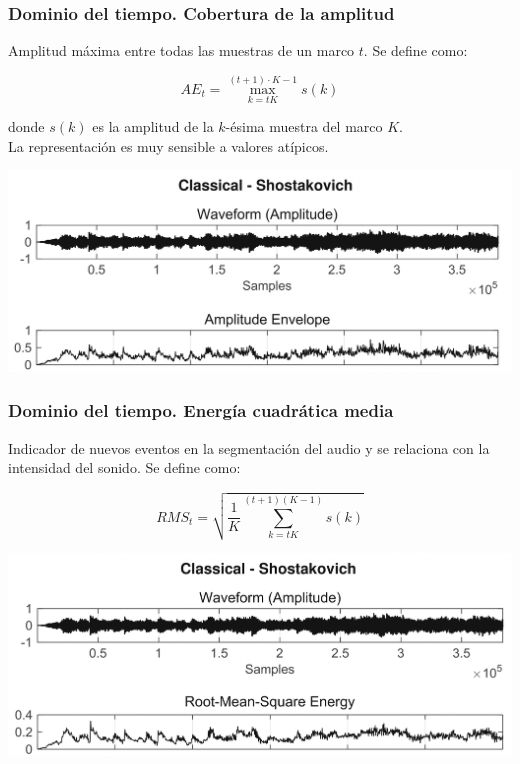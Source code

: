 \documentclass[
10pt, %
aspectratio=169, %
]{beamer}
\begin{document}
	\begin{frame}
		
		\frametitle{Dominio del tiempo. Cobertura de la amplitud}
		
		Amplitud máxima entre todas las muestras de un marco $t$. Se define como:
		
		$${AE}_t = \max_{k=tK}^{(t+1) \cdot K-1} s(k)$$
		
		donde $s(k)$ es la amplitud de la $k$-ésima muestra del marco $K$. \\[2mm]
		
		La representación es muy sensible a valores atípicos.
		
		\vspace{1\baselineskip}
		\centering
		\includegraphics[scale=0.4]{ae.png}
		
	\end{frame}
	
	\begin{frame}
		
		\frametitle{Dominio del tiempo. Energía cuadrática media}
		
		
		Indicador de nuevos eventos en la segmentación del audio y se relaciona con la intensidad del sonido. Se define como:
		
		$${RMS}_t = \sqrt{\frac{1}{K} \sum_{k=tK}^{(t+1)(K-1)} s(k)}$$
		
		\vspace{1\baselineskip}
		\centering
		\includegraphics[scale=0.4]{rms.png}
		
	\end{frame}
	
\end{document}
